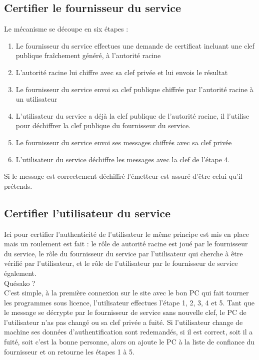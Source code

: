 \documentclass{article}
\begin{document}
\subsection{Certifier le fournisseur du service}

Le mécanisme se découpe en six étapes :
\begin{enumerate}
    \item Le fournisseur du service effectues une demande de certificat incluant une clef publique fraîchement généré, à l'autorité racine
    \item L'autorité racine lui chiffre avec sa clef privée et lui envois le résultat
    \item Le fournisseur du service envoi sa clef publique chiffrée par l'autorité racine à un utilisateur
    \item L'utilisateur du service a déjà la clef publique de l'autorité racine, il l'utilise pour déchiffrer la clef publique du fournisseur du service.
    \item Le fournisseur du service envoi ses messages chiffrés avec sa clef privée
    \item L'utilisateur du service déchiffre les messages avec la clef de l'étape 4.
\end{enumerate}

Si le message est correctement déchiffré l'émetteur est assuré d'être celui qu'il prétends.


\subsection{Certifier l'utilisateur du service}

Ici pour certifier l'authenticité de l'utilisateur le même principe est mis en place mais un roulement est fait : le rôle de autorité racine est joué par le fournisseur du service, le rôle du fournisseur du service par l'utilisateur qui cherche à être vérifié par l'utilisateur, et le rôle de l'utilisateur par le fournisseur de service également.\\
Quésako ?\\
C'est simple, à la première connexion sur le site avec le bon PC qui fait tourner les programmes sous licence, l'utilisateur effectues l'étape 1, 2, 3, 4 et 5.  Tant que le message se décrypte par le fournisseur de service sans nouvelle clef, le PC de l'utilisateur n'as pas changé ou sa clef privée a fuité. Si l'utilisateur change de machine ses données d'authentification sont redemandés, si il est correct, soit il a fuité, soit c'est la bonne personne, alors on ajoute le PC à la liste de confiance du fournisseur et on retourne les étapes 1 à 5.
\end{document}

